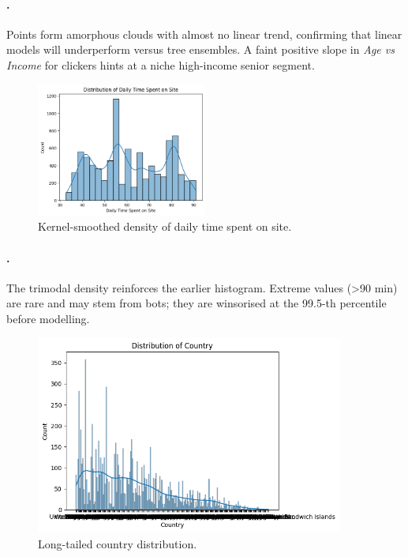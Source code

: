\documentclass[12pt,a4paper]{article}
\begin{document}
\paragraph{.}
Points form amorphous clouds with almost no linear trend, confirming that
linear models will underperform versus tree ensembles.  A faint positive
slope in \textit{Age vs Income} for clickers hints at a niche
high-income senior segment.

\begin{figure}[H]
  \centering
  \includegraphics[width=0.5\textwidth]{output6.png}
  \caption{Kernel-smoothed density of daily time spent on site.}
  \label{fig:time_kde}
\end{figure}

\paragraph{.}
The trimodal density reinforces the earlier histogram.  Extreme values
(>90 min) are rare and may stem from bots; they are winsorised at the
99.5-th percentile before modelling.

\begin{figure}[H]
  \centering
  \includegraphics[width=0.9\textwidth]{output7.png}
  \caption{Long-tailed country distribution.}
  \label{fig:country}
\end{figure}
\end{document}
